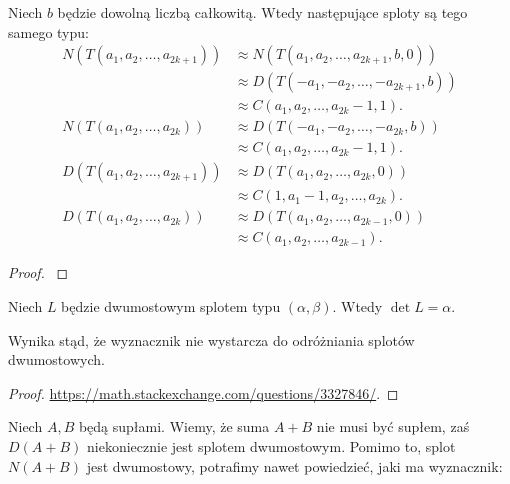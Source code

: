 \begin{proposition}
    Niech $b$ będzie dowolną liczbą całkowitą.
    Wtedy następujące sploty są tego samego typu:
    \begin{align}
        N(T(a_1, a_2, \ldots, a_{2k+1})) & \approx N(T(a_1, a_2, \ldots, a_{2k+1}, b, 0)) \\
                                         & \approx D(T(-a_1, -a_2, \ldots, -a_{2k+1}, b)) \\
                                         & \approx C(a_1, a_2, \ldots, a_{2k}-1, 1). \\
        N(T(a_1, a_2, \ldots, a_{2k}))   & \approx D(T(-a_1, -a_2, \ldots, -a_{2k}, b)) \\
                                         & \approx C(a_1, a_2, \ldots, a_{2k}-1, 1). \\
        D(T(a_1, a_2, \ldots, a_{2k+1})) & \approx D(T(a_1, a_2, \ldots, a_{2k}, 0)) \\
                                         & \approx C(1, a_1-1, a_2, \ldots, a_{2k}). \\
        D(T(a_1, a_2, \ldots, a_{2k}))   & \approx D(T(a_1, a_2, \ldots, a_{2k-1}, 0)) \\
                                         & \approx C(a_1, a_2, \ldots, a_{2k-1}).
    \end{align}
\end{proposition}

\begin{proof}
    \cite[fakt 9.3.4]{murasugi1996}
\end{proof}

\begin{proposition}
    Niech $L$ będzie dwumostowym splotem typu $(\alpha, \beta)$.
    Wtedy $\det L = \alpha$.
\end{proposition}

Wynika stąd, że wyznacznik nie wystarcza do odróżniania splotów dwumostowych.

\begin{proof}
    \url{https://math.stackexchange.com/questions/3327846/}.
\end{proof}

Niech $A, B$ będą supłami.
Wiemy, że suma $A+B$ nie musi być supłem, zaś $D(A+B)$ niekoniecznie jest splotem dwumostowym.
Pomimo to, splot $N(A+B)$ jest dwumostowy, potrafimy nawet powiedzieć, jaki ma wyznacznik:

